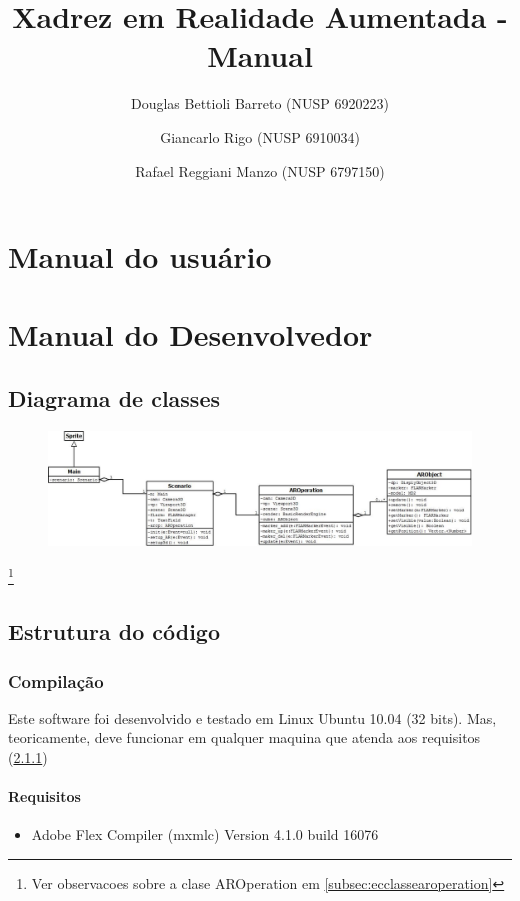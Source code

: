 \documentclass[a4paper,12pt]{book}
\title{Xadrez em Realidade Aumentada - Manual}
\author{
		Douglas Bettioli Barreto (NUSP 6920223)
		\and Giancarlo Rigo (NUSP 6910034)
		\and Rafael Reggiani Manzo (NUSP 6797150)
	   }
\begin{document}
\maketitle

\part{Manual do usu\'ario}
\label{part:manualdousuario}

\part{Manual do Desenvolvedor}
\label{part:manualdodesenvolvedor}
	\chapter{Diagrama de classes}
	\label{ch:diagramadeclasses}
	\begin{figure}[h]
	\centering
	\includegraphics[width=1.2\textwidth]{diagramadeclasses}
	\end{figure}
	\footnote{Ver observacoes sobre a clase AROperation em
			  \ref{subsec:ecclassearoperation}
			 }
			 
	\chapter{Estrutura do c\'odigo}
	\label{ch:estruturadocodigo}
	
	\section{Compila\c c\~ao}
	\label{sec:eccompilacao}
	Este software foi desenvolvido e testado em Linux Ubuntu 10.04 (32 bits). Mas,
	teoricamente, deve funcionar em qualquer maquina que atenda aos requisitos
	(\ref{subsec:ecrequisitos})
	
	\subsection{Requisitos}
	\label{subsec:ecrequisitos}
	\begin{itemize}
		\item{Adobe Flex Compiler (mxmlc) Version 4.1.0 build 16076}
	\end{itemize}
	
\end{document}
